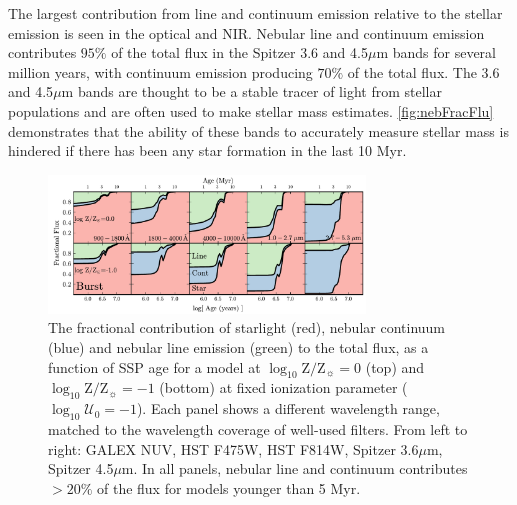 \documentclass[linenumbers, trackchanges, tighten]{aastex61}%
\newcommand{\Fig}[1]{\autoref{fig:#1}}
\newcommand{\logten}{\ensuremath{\log_{10}}}
\newcommand{\logZeq}[1]{\ensuremath{\logten \mathrm{Z}/\mathrm{Z}_{\sun} = #1}}
\newcommand{\logU}{\ensuremath{\logten \mathcal{U}_0}}
\begin{document}
The largest contribution from line and continuum emission relative to the stellar emission is seen in the optical and NIR. Nebular line and continuum emission contributes $95\%$ of the total flux in the Spitzer 3.6 and 4.5$\mu$m bands for several million years, with continuum emission producing $70\%$ of the total flux. The 3.6 and 4.5$\mu$m bands are thought to be a stable tracer of light from stellar populations and are often used to make stellar mass estimates. \Fig{nebFracFlu} demonstrates that the ability of these bands to accurately measure stellar mass is hindered if there has been any star formation in the last 10 Myr.

\begin{figure}[!htbp]
  \begin{centering}
    \includegraphics[width=0.75\textwidth]{f12.pdf}
    \caption{The fractional contribution of starlight (red), nebular continuum (blue) and nebular line emission (green) to the total flux, as a function of SSP age for a model at \logZeq{0} (top) and \logZeq{-1} (bottom) at fixed ionization parameter ($\logU=-1$). Each panel shows a different wavelength range, matched to the wavelength coverage of well-used filters. From left to right: GALEX NUV, HST F475W, HST F814W, Spitzer 3.6$\mu$m, Spitzer 4.5$\mu$m. In all panels, nebular line and continuum contributes $>20\%$ of the flux for models younger than 5 Myr.}
    \label{fig:nebFracFlu}
  \end{centering}
\end{figure}
\end{document}
